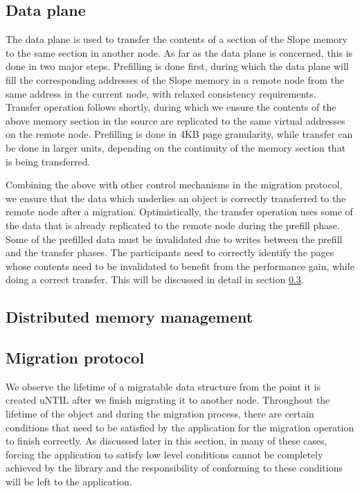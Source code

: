 \subsection{Data plane}
The data plane is used to transfer the contents of a section of the Slope
memory to the same section in another node. As far as the data plane is
concerned, this is done in two major steps. Prefilling is done first, during
which the data plane will fill the corresponding addresses of the
Slope memory in a remote node from the same address in the current node, with
relaxed consistency requirements. Transfer operation follows shortly, during
which we ensure the contents of the above memory section in the source are
replicated to the same virtual addresses on the remote node. Prefilling is done
in 4KB page granularity, while transfer can be done in larger units, depending
on the continuity of the memory section that is being transferred.

Combining the above with other control mechanisms in the migration protocol, we
ensure that the data which underlies an object is correctly transferred to the
remote node after a migration. Optimistically, the transfer operation uses some
of the data that is already replicated to the remote node during the prefill
phase. Some of the prefilled data must be invalidated due to writes between the
prefill and the transfer phases. The participants need to correctly identify
the pages whose contents need to be invalidated to benefit from the performance
gain, while doing a correct transfer. This will be discussed in detail in section
\ref{sec:migrationprotocol}.

\subsection{Distributed memory management}

\subsection{Migration protocol}
\label{sec:migrationprotocol}
We observe the lifetime of a migratable data structure from the point it is
created uNTIL after we finish migrating it to another node. Throughout the
lifetime of the object and during the migration process, there are certain
conditions that need to be satisfied by the application for the migration
operation to finish correctly. As discussed later in this section,
in many of these cases, forcing the application to satisfy low level conditions
cannot be completely achieved by the library and the responsibility of
conforming to these conditions will be left to the application.

